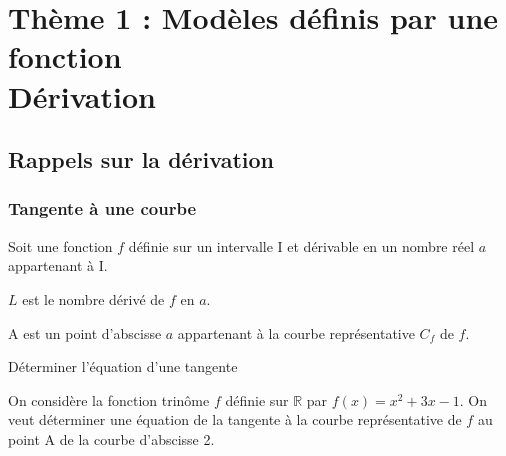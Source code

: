 \chapter[Thème 1 $-$ Dérivation]{Thème 1 : Modèles définis par une fonction \\Dérivation}
\thispagestyle{fancy}

\section{Rappels sur la dérivation}

\subsection{Tangente à une courbe}

Soit une fonction $f$ définie sur un intervalle I et dérivable en un nombre réel $a$ appartenant à I.

$L$ est le nombre dérivé de $f$ en $a$.

A est un point d'abscisse $a$ appartenant à la courbe représentative $C_f$ de $f$.



    \begin{bdefi}
        \pointilles[\textwidth-0.5cm]
        
        \pointilles[\textwidth-0.5cm]
    \end{bdefi}
    
    \begin{bprop}
    	\pointilles[\textwidth-0.5cm]
    	
    	\pointilles[\textwidth-0.5cm]
    \end{bprop}
    
    \begin{bmethodet}{Déterminer l'équation d'une tangente}
    	
    	On considère la fonction trinôme $f$ définie sur $\mathbb{R}$ par $f(x)=x^2+3 x-1$.
    	On veut déterminer une équation de la tangente à la courbe représentative de $f$ au point A de la courbe d'abscisse 2.
    	
    	
    	\pointilles[\textwidth-0.5cm]
    	
    	\pointilles[\textwidth-0.5cm]
    	
    	\pointilles[\textwidth-0.5cm]
    	
    	\pointilles[\textwidth-0.5cm]
    	
    	\pointilles[\textwidth-0.5cm]
    	
    	\pointilles[\textwidth-0.5cm]
    	
    	\pointilles[\textwidth-0.5cm]
    \end{bmethodet}
    
